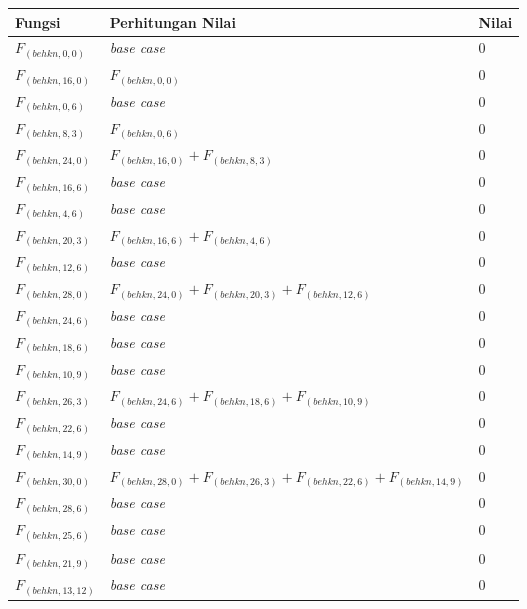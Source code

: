 \begin{appendices}
  \begin{table}[H]
  	\centering
  	\begin{tabular} {|p{3cm}|p{5cm}|p{1cm}|} \hline
  		Fungsi & Perhitungan Nilai & Nilai \\ \hline
  		$ F_{(behkn, 0, 0)} $ & \textit{base case} & $ 0 $ \\ \hline
  		$ F_{(behkn, 16, 0)}  $ & $F_{(behkn, 0, 0)}$ & $ 0 $ \\ \hline
  		$ F_{(behkn, 0, 6)} $ & \textit{base case} & $ 0 $ \\ \hline
  		$ F_{(behkn, 8, 3)}  $ & $F_{(behkn, 0, 6)}$ & $ 0 $ \\ \hline
  		$ F_{(behkn, 24, 0)}  $ & $F_{(behkn, 16, 0)} + F_{(behkn, 8, 3)}$ & $ 0 $ \\ \hline
  		$ F_{(behkn, 16, 6)} $ & \textit{base case} & $ 0 $ \\ \hline
  		$ F_{(behkn, 4, 6)} $ & \textit{base case} & $ 0 $ \\ \hline
  		$ F_{(behkn, 20, 3)}  $ & $F_{(behkn, 16, 6)} + F_{(behkn, 4, 6)}$ & $ 0 $ \\ \hline
  		$ F_{(behkn, 12, 6)} $ & \textit{base case} & $ 0 $ \\ \hline
  		$ F_{(behkn, 28, 0)}  $ & $F_{(behkn, 24, 0)} + F_{(behkn, 20, 3)} + F_{(behkn, 12, 6)}$ & $ 0 $ \\ \hline
  		$ F_{(behkn, 24, 6)} $ & \textit{base case} & $ 0 $ \\ \hline
  		$ F_{(behkn, 18, 6)} $ & \textit{base case} & $ 0 $ \\ \hline
  		$ F_{(behkn, 10, 9)} $ & \textit{base case} & $ 0 $ \\ \hline
  		$ F_{(behkn, 26, 3)}  $ & $F_{(behkn, 24, 6)} + F_{(behkn, 18, 6)} + F_{(behkn, 10, 9)}$ & $ 0 $ \\ \hline
  		$ F_{(behkn, 22, 6)} $ & \textit{base case} & $ 0 $ \\ \hline
  		$ F_{(behkn, 14, 9)} $ & \textit{base case} & $ 0 $ \\ \hline
  		$ F_{(behkn, 30, 0)}  $ & $F_{(behkn, 28, 0)} + F_{(behkn, 26, 3)} + F_{(behkn, 22, 6)} + F_{(behkn, 14, 9)}$ & $ 0 $ \\ \hline
  		$ F_{(behkn, 28, 6)} $ & \textit{base case} & $ 0 $ \\ \hline
  		$ F_{(behkn, 25, 6)} $ & \textit{base case} & $ 0 $ \\ \hline
  		$ F_{(behkn, 21, 9)} $ & \textit{base case} & $ 0 $ \\ \hline
  		$ F_{(behkn, 13, 12)} $ & \textit{base case} & $ 0 $ \\ \hline

\end{tabular}
\end{table}
\end{appendices}
